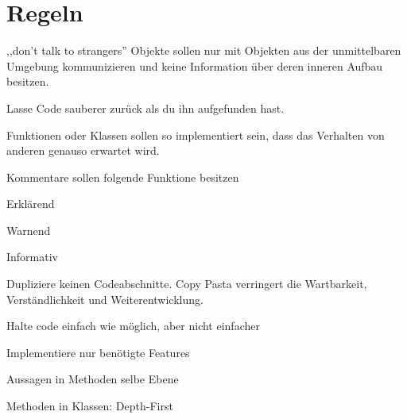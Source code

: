 \section{Regeln}
,,don't talk to strangers''
Objekte sollen nur mit Objekten aus der unmittelbaren Umgebung kommunizieren und keine Information
über deren inneren Aufbau besitzen.

Lasse Code sauberer zurück als du ihn aufgefunden hast.

Funktionen oder Klassen sollen so implementiert sein, dass das Verhalten von anderen genauso
erwartet wird.

Kommentare sollen folgende Funktione besitzen
\begin{compactitem}
    \item Erklärend
    \item Warnend
    \item Informativ
\end{compactitem}

Dupliziere keinen Codeabschnitte. Copy Pasta verringert die Wartbarkeit, Verständlichkeit und
Weiterentwicklung.

Halte code einfach wie möglich, aber nicht einfacher

Implementiere nur benötigte Features

\begin{compactitem}
    \item Aussagen in Methoden selbe Ebene
    \item Methoden in Klassen: Depth-First
\end{compactitem}
